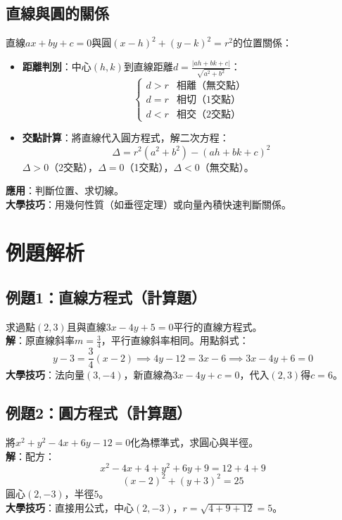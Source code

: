 \subsection{直線與圓的關係}
直線$ax + by + c = 0$與圓$(x - h)^2 + (y - k)^2 = r^2$的位置關係：
\begin{itemize}
    \item \textbf{距離判別}：中心$(h, k)$到直線距離$d = \frac{|ah + bk + c|}{\sqrt{a^2 + b^2}}$：
    \[
    \begin{cases}
    d > r & \text{相離（無交點）} \\
    d = r & \text{相切（1交點）} \\
    d < r & \text{相交（2交點）}
    \end{cases}
    \]
    \item \textbf{交點計算}：將直線代入圓方程式，解二次方程：
    \[
    \Delta = r^2(a^2 + b^2) - (ah + bk + c)^2
    \]
    $\Delta > 0$（2交點），$\Delta = 0$（1交點），$\Delta < 0$（無交點）。
\end{itemize}
\textbf{應用}：判斷位置、求切線。\\
\textbf{大學技巧}：用幾何性質（如垂徑定理）或向量內積快速判斷關係。

\section{例題解析}

\subsection{例題1：直線方程式（計算題）}
求過點$(2, 3)$且與直線$3x - 4y + 5 = 0$平行的直線方程式。\\
\textbf{解}：原直線斜率$m = \frac{3}{4}$，平行直線斜率相同。用點斜式：
\[
y - 3 = \frac{3}{4} (x - 2) \implies 4y - 12 = 3x - 6 \implies 3x - 4y + 6 = 0
\]
\textbf{大學技巧}：法向量$(3, -4)$，新直線為$3x - 4y + c = 0$，代入$(2, 3)$得$c = 6$。

\subsection{例題2：圓方程式（計算題）}
將$x^2 + y^2 - 4x + 6y - 12 = 0$化為標準式，求圓心與半徑。\\
\textbf{解}：配方：
\[
x^2 - 4x + 4 + y^2 + 6y + 9 = 12 + 4 + 9
\]
\[
(x - 2)^2 + (y + 3)^2 = 25
\]
圓心$(2, -3)$，半徑$5$。\\
\textbf{大學技巧}：直接用公式，中心$\left(2, -3\right)$，$r = \sqrt{4 + 9 + 12} = 5$。

